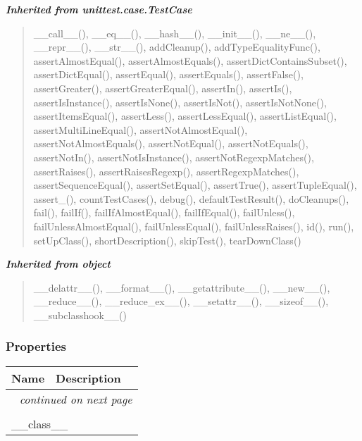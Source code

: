\large{\textbf{\textit{Inherited from unittest.case.TestCase}}}

\begin{quote}
\_\_call\_\_(), \_\_eq\_\_(), \_\_hash\_\_(), \_\_init\_\_(), \_\_ne\_\_(), \_\_repr\_\_(), \_\_str\_\_(), addCleanup(), addTypeEqualityFunc(), assertAlmostEqual(), assertAlmostEquals(), assertDictContainsSubset(), assertDictEqual(), assertEqual(), assertEquals(), assertFalse(), assertGreater(), assertGreaterEqual(), assertIn(), assertIs(), assertIsInstance(), assertIsNone(), assertIsNot(), assertIsNotNone(), assertItemsEqual(), assertLess(), assertLessEqual(), assertListEqual(), assertMultiLineEqual(), assertNotAlmostEqual(), assertNotAlmostEquals(), assertNotEqual(), assertNotEquals(), assertNotIn(), assertNotIsInstance(), assertNotRegexpMatches(), assertRaises(), assertRaisesRegexp(), assertRegexpMatches(), assertSequenceEqual(), assertSetEqual(), assertTrue(), assertTupleEqual(), assert\_(), countTestCases(), debug(), defaultTestResult(), doCleanups(), fail(), failIf(), failIfAlmostEqual(), failIfEqual(), failUnless(), failUnlessAlmostEqual(), failUnlessEqual(), failUnlessRaises(), id(), run(), setUpClass(), shortDescription(), skipTest(), tearDownClass()
\end{quote}

\large{\textbf{\textit{Inherited from object}}}

\begin{quote}
\_\_delattr\_\_(), \_\_format\_\_(), \_\_getattribute\_\_(), \_\_new\_\_(), \_\_reduce\_\_(), \_\_reduce\_ex\_\_(), \_\_setattr\_\_(), \_\_sizeof\_\_(), \_\_subclasshook\_\_()
\end{quote}


  \subsubsection{Properties}

    \vspace{-1cm}
\hspace{\varindent}\begin{longtable}{|p{\varnamewidth}|p{\vardescrwidth}|l}
\cline{1-2}
\cline{1-2} \centering \textbf{Name} & \centering \textbf{Description}& \\
\cline{1-2}
\endhead\cline{1-2}\multicolumn{3}{r}{\small\textit{continued on next page}}\\\endfoot\cline{1-2}
\endlastfoot\multicolumn{2}{|l|}{\textit{Inherited from object}}\\
\multicolumn{2}{|p{\varwidth}|}{\raggedright \_\_class\_\_}\\
\cline{1-2}
\end{longtable}


